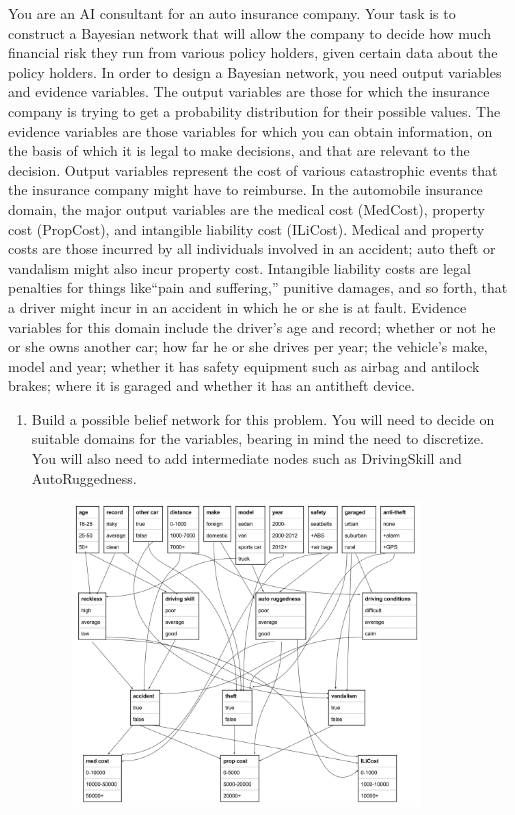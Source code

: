 \documentclass[12pt]{article}
\newenvironment{problem}[2][Problem]{\begin{trivlist}
\item[\hskip \labelsep {\bfseries #1}\hskip \labelsep {\bfseries #2.}]}{\end{trivlist}}
\begin{document}
\begin{problem}{6}
	You are an AI consultant for an auto insurance company. Your task is to construct a Bayesian network that will allow the company to decide how much financial risk they run from various policy holders, given certain data about the policy holders. In order to design a Bayesian network, you need output variables and evidence variables. The output variables are those for which the insurance company is trying to get a probability distribution for their possible values. The evidence variables are those variables for which you can obtain information, on the basis of which it is legal to make decisions, and that are relevant to the decision. Output variables represent the cost of various catastrophic events that the insurance company might have to reimburse. In the automobile insurance domain, the major output variables are the medical cost (MedCost), property cost (PropCost), and intangible liability cost (ILiCost). Medical and property costs are those incurred by all individuals involved in an accident; auto theft or vandalism might also incur property cost. Intangible liability costs are legal penalties for things like``pain and suffering,'' punitive damages, and so forth, that a driver might incur in an accident in which he or she is at fault. Evidence variables for this domain include the driver's age and record; whether or not he or she owns another car; how far he or she drives per year; the vehicle's make, model and year; whether it has safety equipment such as airbag and antilock brakes; where it is garaged and whether it has an antitheft device.
	\begin{enumerate}
		\item Build a possible belief network for this problem. You will need to decide on suitable domains for the variables, bearing in mind the need to discretize. You will also need to add intermediate nodes such as DrivingSkill and AutoRuggedness.
			\begin{figure}[h]
				\centering
				\includegraphics[width=0.875\textwidth]{fig/hw4-6.png}

\end{figure}
\end{enumerate}
\end{problem}
\end{document}

